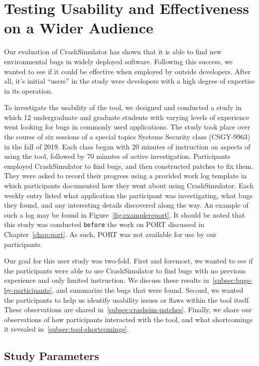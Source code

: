 \chapter{Testing Usability and Effectiveness on a Wider Audience}
\label{chap:userstudy}

Our evaluation of CrashSimulator has shown that it is able to find new environmental bugs in widely deployed software. Following this success, we wanted to see if it
could be effective when employed by outside developers.
After all, it's initial ``users'' in the study were developers with a high degree of expertise in its operation.

To investigate the usability of the tool,
we designed and conducted a study in which 12 undergraduate and graduate students with varying levels of experience went looking for bugs in commonly used applications.
The study took place over the course of six sessions
of a special topics Systems Security class (CSGY-9963) in the fall of 2019.
Each class began with 20
minutes of instruction on aspects of using the tool, followed by 70 minutes of active investigation. Participants employed
CrashSimulator to find bugs, and then constructed patches to fix
them.
They were asked to record their progress
using a provided work log template in which participants documented
how they went about using CrashSimulator. 
Each weekly entry listed what application the participant was
investigating,  what bugs they found, and any interesting details discovered along the way. An example of such a log may be found in Figure~\ref{fig:examplereport}.
It should be noted that this study was conducted {\tt before} the work on PORT discussed in Chapter~\ref{chap:port}.
As such,
PORT was not available for use by our participants.

Our goal for this user study was two-fold.  First and foremost,
we wanted to see if the participants were able to use CrashSimulator to find bugs with no previous experience and only limited instruction.
We discuss these results in~\ref{subsec:bugs-by-participants}, and summarize the bugs that were found.
Second, we wanted the participants to help us identify usability issues
or flaws within the tool itself. These observations are shared in~\ref{subsec:crashsim-patches}. Finally, we share our observations
of how participants interacted with the tool, and what shortcomings
it revealed in~\ref{subsec:tool-shortcomings}.

\section{Study Parameters}
\label{sec:studyparameters}

